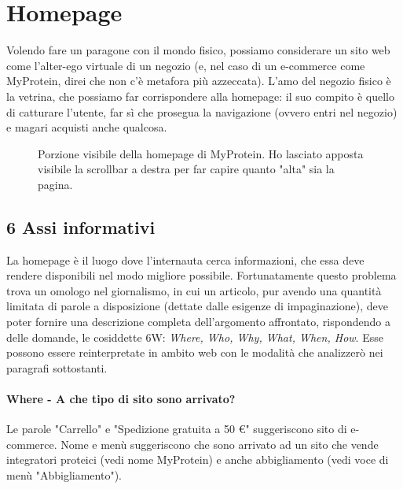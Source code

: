\section{Homepage}
Volendo fare un paragone con il mondo fisico, possiamo considerare un sito web come l'alter-ego virtuale di un negozio (e, nel caso di un e-commerce come MyProtein, direi che non c'è metafora più azzeccata). L'amo del negozio fisico è la vetrina, che possiamo far corrispondere alla homepage: il suo compito è quello di catturare l'utente, far sì che prosegua la navigazione (ovvero entri nel negozio) e magari acquisti anche qualcosa.
\begin{figure}[!htb]
	\caption{\label{fig:figura1} Porzione visibile della homepage di MyProtein. Ho lasciato apposta visibile la scrollbar a destra per far capire quanto "alta" sia la pagina.}
\end{figure}
\subsection{6 Assi informativi}
La homepage è il luogo dove l'internauta cerca informazioni, che essa deve rendere disponibili nel modo migliore possibile. Fortunatamente questo problema trova un omologo nel giornalismo, in cui un articolo, pur avendo una quantità limitata di parole a disposizione (dettate dalle esigenze di impaginazione), deve poter fornire una descrizione completa dell'argomento affrontato, rispondendo a delle domande, le cosiddette 6W: \textit{Where, Who, Why, What, When, How}. Esse possono essere reinterpretate in ambito web con le modalità che analizzerò nei paragrafi sottostanti.
\paragraph{Where - A che tipo di sito sono arrivato?}
Le parole "Carrello" e "Spedizione gratuita a 50 \euro" suggeriscono sito di e-commerce. Nome e menù suggeriscono che sono arrivato ad un sito che vende integratori proteici (vedi nome MyProtein) e anche abbigliamento (vedi voce di menù "Abbigliamento"). 

